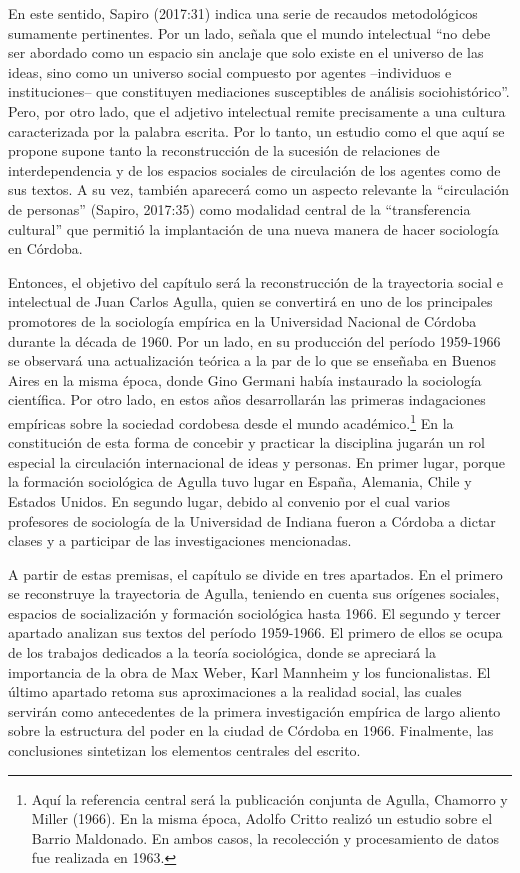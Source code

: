 En este sentido, Sapiro (2017:31) indica una serie de recaudos metodológicos sumamente pertinentes. Por un lado, señala que el mundo intelectual ``no debe ser abordado como un espacio sin anclaje que solo existe en el universo de las ideas, sino como un universo social compuesto por agentes --individuos e instituciones-- que constituyen mediaciones susceptibles de análisis sociohistórico''. Pero, por otro lado, que el adjetivo intelectual remite precisamente a una cultura caracterizada por la palabra escrita. Por lo tanto, un estudio como el que aquí se propone supone tanto la reconstrucción de la sucesión de relaciones de interdependencia y de los espacios sociales de circulación de los agentes como de sus textos. A su vez, también aparecerá como un aspecto relevante la ``circulación de personas'' (Sapiro, 2017:35) como modalidad central de la ``transferencia cultural'' que permitió la implantación de una nueva manera de hacer sociología en Córdoba.

Entonces, el objetivo del capítulo será la reconstrucción de la trayectoria social e intelectual de Juan Carlos Agulla, quien se convertirá en uno de los principales promotores de la sociología empírica en la Universidad Nacional de Córdoba durante la década de 1960. Por un lado, en su producción del período 1959-1966 se observará una actualización teórica a la par de lo que se enseñaba en Buenos Aires en la misma época, donde Gino Germani había instaurado la sociología científica. Por otro lado, en estos años desarrollarán las primeras indagaciones empíricas sobre la sociedad cordobesa desde el mundo académico.\footnote{Aquí la referencia central será la publicación conjunta de Agulla, Chamorro y Miller (1966). En la misma época, Adolfo Critto realizó un estudio sobre el Barrio Maldonado. En ambos casos, la recolección y procesamiento de datos fue realizada en 1963.} En la constitución de esta forma de concebir y practicar la disciplina jugarán un rol especial la circulación internacional de ideas y personas. En primer lugar, porque la formación sociológica de Agulla tuvo lugar en España, Alemania, Chile y Estados Unidos. En segundo lugar, debido al convenio por el cual varios profesores de sociología de la Universidad de Indiana fueron a Córdoba a dictar clases y a participar de las investigaciones mencionadas.

A partir de estas premisas, el capítulo se divide en tres apartados. En el primero se reconstruye la trayectoria de Agulla, teniendo en cuenta sus orígenes sociales, espacios de socialización y formación sociológica hasta 1966. El segundo y tercer apartado analizan sus textos del período 1959-1966. El primero de ellos se ocupa de los trabajos dedicados a la teoría sociológica, donde se apreciará la importancia de la obra de Max Weber, Karl Mannheim y los funcionalistas. El último apartado retoma sus aproximaciones a la realidad social, las cuales servirán como antecedentes de la primera investigación empírica de largo aliento sobre la estructura del poder en la ciudad de Córdoba en 1966. Finalmente, las conclusiones sintetizan los elementos centrales del escrito.

